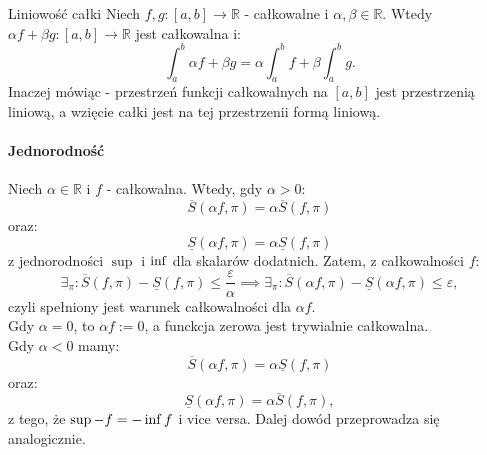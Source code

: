 \documentclass{article}
\numberwithin{defi}{section}
\numberwithin{defi}{section}
\newcommand{\R}{\mathbb{R}}
\renewcommand{\inf}{\mathop{\mathrm{inf}\vphantom{\mathrm{sup}}}}
\newcommand{\Sd}{\underline{S}}
\newcommand{\Sg}{\overline{S}}
\providecommand{\eps}{\varepsilon}
\renewcommand{\leq}{\leqslant}
\begin{document}
\begin{twier}{Liniowość całki}
    Niech $f, g: [a, b] \to \R$ - całkowalne i $\alpha, \beta \in \R$. Wtedy $\alpha f + \beta g: [a, b] \to \R$ jest całkowalna i: \begin{equation}
        \int_{a}^{b} \alpha f + \beta g = \alpha \int_{a}^{b} f + \beta \int_{a}^{b} g.
    \end{equation} Inaczej mówiąc - przestrzeń funkcji całkowalnych na $[a, b]$ jest przestrzenią liniową, a wzięcie całki jest na tej przestrzenii formą liniową.
\end{twier}

\begin{dow}{}
    \paragraph{Jednorodność} Niech $\alpha \in \R$ i $f$ - całkowalna. Wtedy, gdy $\alpha > 0$: \begin{equation*}
        \Sg( \alpha f, \pi) = \alpha \Sg(  f, \pi)
    \end{equation*} oraz: \begin{equation*}
        \Sd( \alpha f, \pi) = \alpha \Sd(  f, \pi)
    \end{equation*} z jednorodności $\sup$ i $\inf$ dla skalarów dodatnich. Zatem, z całkowalności $f$: \begin{equation}
        \exists_{\pi}:  \Sg( f, \pi) - \Sd( f, \pi) \leq \frac{\eps}{\alpha} \implies \exists_{\pi}:  \Sg( \alpha f, \pi) - \Sd( \alpha f, \pi) \leq \eps,
    \end{equation} czyli spełniony jest warunek całkowalności dla $\alpha f$. \\
    Gdy $\alpha = 0$, to $\alpha f := 0$, a funckcja zerowa jest trywialnie całkowalna. \\
    Gdy $\alpha < 0$ mamy: \begin{equation*}
        \Sg( \alpha f, \pi) = \alpha \Sd(  f, \pi)
    \end{equation*} oraz: \begin{equation*}
        \Sd( \alpha f, \pi) = \alpha \Sg(  f, \pi),
    \end{equation*} z tego, że $\sup -f = - \inf f$ i vice versa. Dalej dowód przeprowadza się analogicznie.
    

\end{dow}
\end{document}
